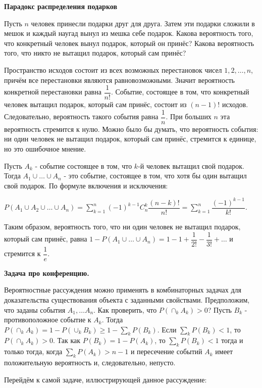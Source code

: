\documentclass[a4paper]{article}
\begin{document}
\begin{colloq}
   		\textbf{Парадокс распределения подарков}
   		
   		Пусть $n$ человек принесли подарки друг для друга. Затем эти подарки сложили в мешок и каждый наугад вынул из мешка себе подарок. Какова вероятность того, что конкретный человек вынул подарок, который он принёс? Какова вероятность того, что никто не вытащил подарок, который сам принёс?
   		
   		Пространство исходов состоит из всех возможных перестановок чисел $1, 2, \dots , n$, причём все перестановки являются равновозможными. Значит вероятность конкретной перестановки равна $\dfrac{1}{n!}$. Событие, состоящее в том, что конкретный человек вытащил подарок, который сам принёс, состоит из $(n - 1)!$ исходов. Следовательно, вероятность такого
   		события равна $\dfrac{1}{n}$. При больших $n$ эта вероятность стремится к нулю.	Можно было бы думать, что вероятность события: ни один человек не вытащил подарок, который сам принёс, стремится к единице, но это ошибочное мнение.
   		
   		Пусть $A_k$ - событие состоящее в том, что $k$-й человек вытащил свой подарок. Тогда $A_1 \cup \dots \cup A_n$ - это событие, состоящее в том, что хотя бы один вытащил свой подарок. По	формуле включения и исключения: 
   		
   		$P(A_1 \cup A_2 \cup \dots \cup A_n) = \sum_{k = 1}^{n} (-1)^{k - 1} C_n^k \dfrac{(n - k)!}{n!} = \sum_{k = 1}^{n} \dfrac{(-1)^{k-1}}{k!}$.
   		
   		Таким образом, вероятность того, что ни один человек не вытащил подарок, который сам принёс, равна $1 - P(A_1 \cup \dots \cup A_n) = 1 - 1 + \dfrac{1}{2!} - \dfrac{1}{3!} + \dots$ и стремится к $\dfrac{1}{e}$.
   		
   		\textbf{Задача про конференцию.}
   		
   		Вероятностные рассуждения можно применять в комбинаторных задачах для доказательства существования объекта с заданными свойствами. Предположим, что заданы события $A_1, \dots A_n$. Как проверить, что $P(\cap_k A_k) > 0$? Пусть $B_k$ - противоположное событие к $A_k$. Тогда $P(\cap_k A_k) = 1 - P(\cup_k B_k) \geqslant 1 - \sum_k P(B_k)$. Если $\sum_k P(B_k) < 1$, то $P(\cap_k A_k) > 0$. Так как $P(B_k) = 1 - P(A_k)$, то $\sum_k P(B_k) < 1$ тогда и только тогда, когда $\sum_k P(A_k) > n - 1$ и пересечение событий $A_k$ имеет положительную вероятность и, следовательно, непусто.
   		
   		Перейдём к самой задаче, иллюстрирующей данное рассуждение:
   		

\end{colloq}
\end{document}
